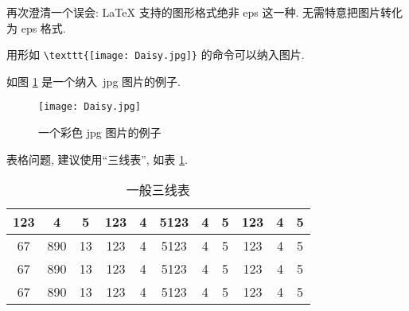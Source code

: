 \documentclass{WHUPhd}  %
\begin{document}
再次澄清一个误会: \LaTeX{} 支持的图形格式绝非 eps 这一种. 无需特意把图片转化为 eps 格式.

用形如 \verb|\texttt{[image: Daisy.jpg]}| 的命令可以纳入图片.

如图 \ref{fig:1} 是一个纳入~jpg 图片的例子.

\begin{figure}[ht]
\centering
  \texttt{[image: Daisy.jpg]}
  \caption{一个彩色 jpg 图片的例子}
  \label{fig:1}
\end{figure}

表格问题, 建议使用``三线表'', 如表 \ref{tab:1}.

\begin{table}[ht]
\centering
\caption{一般三线表}
\label{tab:1}
    \begin{tabular}{c c c c c c c c c c c}
    \hline
    123 & 4  & 5  & 123 & 4 & 5123 & 4 & 5 & 123 & 4 & 5\\
    \hline
    67 & 890 & 13 & 123 & 4 & 5123 & 4 & 5 & 123 & 4 & 5\\
    67 & 890 & 13 & 123 & 4 & 5123 & 4 & 5 & 123 & 4 & 5\\
    67 & 890 & 13 & 123 & 4 & 5123 & 4 & 5 & 123 & 4 & 5\\
    \hline
    \end{tabular}
\end{table}




\end{document}
